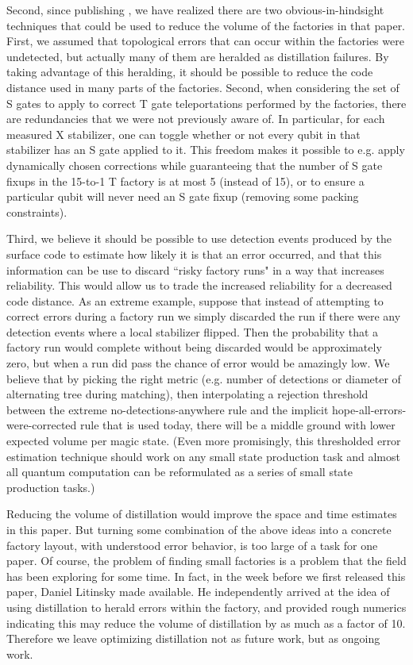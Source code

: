 \documentclass[superscriptaddress,notitlepage,longbibliography]{revtex4-1}
\theoremstyle{definition}
\theoremstyle{definition}
\begin{document}
Second, since publishing \cite{gidney2018magic}, we have realized there are two obvious-in-hindsight techniques that could be used to reduce the volume of the factories in that paper.
First, we assumed that topological errors that can occur within the factories were undetected, but actually many of them are heralded as distillation failures.
By taking advantage of this heralding, it should be possible to reduce the code distance used in many parts of the factories.
Second, when considering the set of S gates to apply to correct T gate teleportations performed by the factories, there are redundancies that we were not previously aware of.
In particular, for each measured X stabilizer, one can toggle whether or not every qubit in that stabilizer has an S gate applied to it.
This freedom makes it possible to e.g. apply dynamically chosen corrections while guaranteeing that the number of S gate fixups in the 15-to-1 T factory is at most 5 (instead of 15), or to ensure a particular qubit will never need an S gate fixup (removing some packing constraints).

Third, we believe it should be possible to use detection events produced by the surface code to estimate how likely it is that an error occurred, and that this information can be use to discard ``risky factory runs" in a way that increases reliability.
This would allow us to trade the increased reliability for a decreased code distance.
As an extreme example, suppose that instead of attempting to correct errors during a factory run we simply discarded the run if there were any detection events where a local stabilizer flipped.
Then the probability that a factory run would complete without being discarded would be approximately zero, but when a run did pass the chance of error would be amazingly low.
We believe that by picking the right metric (e.g. number of detections or diameter of alternating tree during matching), then interpolating a rejection threshold between the extreme no-detections-anywhere rule and the implicit hope-all-errors-were-corrected rule that is used today, there will be a middle ground with lower expected volume per magic state.
(Even more promisingly, this thresholded error estimation technique should work on any small state production task and almost all quantum computation can be reformulated as a series of small state production tasks.)

Reducing the volume of distillation would improve the space and time estimates in this paper.
But turning some combination of the above ideas into a concrete factory layout, with understood error behavior, is too large of a task for one paper.
Of course, the problem of finding small factories is a problem that the field has been exploring for some time.
In fact, in the week before we first released this paper, Daniel Litinsky made \cite{litinski2019magic} available.
He independently arrived at the idea of using distillation to herald errors within the factory, and provided rough numerics indicating this may reduce the volume of distillation by as much as a factor of 10.
Therefore we leave optimizing distillation not as future work, but as ongoing work.
\end{document}
